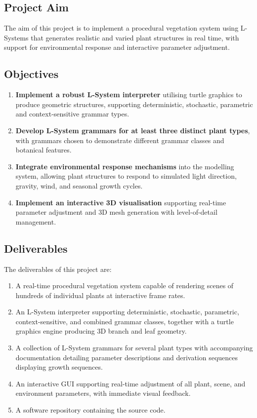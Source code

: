 \subsection{Project Aim}

The aim of this project is to implement a procedural vegetation system using L-Systems that generates
realistic and varied plant structures in real time, with support for environmental response and interactive
parameter adjustment.

\subsection{Objectives}

\begin{enumerate}
  \item \textbf{Implement a robust L-System interpreter} utilising turtle graphics to produce geometric
    structures, supporting deterministic, stochastic, parametric and context-sensitive grammar types.
  \item \textbf{Develop L-System grammars for at least three distinct plant types}, with grammars chosen to
    demonstrate different grammar classes and botanical features.
  \item \textbf{Integrate environmental response mechanisms} into the modelling system, allowing plant
    structures to respond to simulated light direction, gravity, wind, and seasonal growth cycles.
  \item \textbf{Implement an interactive 3D visualisation} supporting real-time parameter adjustment and 3D
    mesh generation with level-of-detail management.
\end{enumerate}

\subsection{Deliverables}

The deliverables of this project are:
\begin{enumerate}
  \item A real-time procedural vegetation system capable of rendering scenes of hundreds of individual plants
    at interactive frame rates.
  \item An L-System interpreter supporting deterministic, stochastic, parametric, context-sensitive, and
    combined grammar classes, together with a turtle graphics engine producing 3D branch and leaf geometry.
  \item A collection of L-System grammars for several plant types with accompanying documentation detailing
    parameter descriptions and derivation sequences displaying growth sequences.
  \item An interactive GUI supporting real-time adjustment of all plant, scene, and environment parameters,
    with immediate visual feedback.
  \item A software repository containing the source code.
\end{enumerate}
